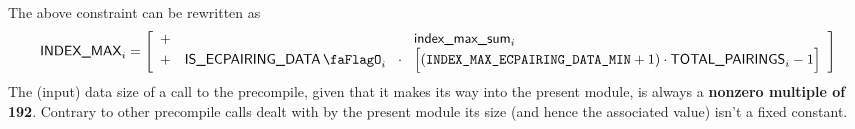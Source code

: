 The above constraint can be rewritten as
\[
	\indexMax_{i}
	=
	\left[ \begin{array}{crcl}
			+ &                      &                   & \locIndexMaxSum_{i}                                                      \\
			+ & \isEcpairingData_{i} & \!\!\!\cdot\!\!\! & \Big[ (\indexMaxEcPairingDataMin + 1) \cdot \totalPairings_{i} - 1 \Big] \\
		\end{array} \right]
\]
\saNote{} The (input) data size of a call to the  precompile, given that it makes its way into the present module, is always a \textbf{nonzero multiple of 192}. Contrary to other precompile calls dealt with by the present module its size (and hence the associated \indexMax{} value) isn't a fixed constant.